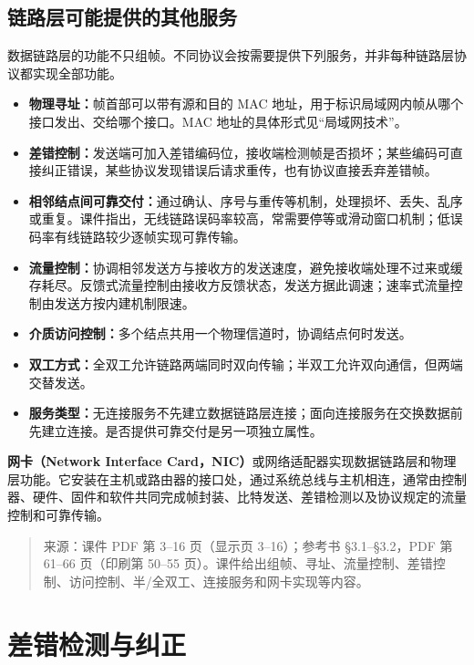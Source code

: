 
\subsection{链路层可能提供的其他服务}
数据链路层的功能不只组帧。不同协议会按需要提供下列服务，并非每种链路层协议都实现全部功能。

\begin{itemize}
 \item \textbf{物理寻址：}帧首部可以带有源和目的 MAC 地址，用于标识局域网内帧从哪个接口发出、交给哪个接口。MAC 地址的具体形式见“局域网技术”。
 \item \textbf{差错控制：}发送端可加入差错编码位，接收端检测帧是否损坏；某些编码可直接纠正错误，某些协议发现错误后请求重传，也有协议直接丢弃差错帧。
 \item \textbf{相邻结点间可靠交付：}通过确认、序号与重传等机制，处理损坏、丢失、乱序或重复。课件指出，无线链路误码率较高，常需要停等或滑动窗口机制；低误码率有线链路较少逐帧实现可靠传输。
 \item \textbf{流量控制：}协调相邻发送方与接收方的发送速度，避免接收端处理不过来或缓存耗尽。反馈式流量控制由接收方反馈状态，发送方据此调速；速率式流量控制由发送方按内建机制限速。
 \item \textbf{介质访问控制：}多个结点共用一个物理信道时，协调结点何时发送。
 \item \textbf{双工方式：}全双工允许链路两端同时双向传输；半双工允许双向通信，但两端交替发送。
 \item \textbf{服务类型：}无连接服务不先建立数据链路层连接；面向连接服务在交换数据前先建立连接。是否提供可靠交付是另一项独立属性。
\end{itemize}

\textbf{网卡（Network Interface Card，NIC）}或网络适配器实现数据链路层和物理层功能。它安装在主机或路由器的接口处，通过系统总线与主机相连，通常由控制器、硬件、固件和软件共同完成帧封装、比特发送、差错检测以及协议规定的流量控制和可靠传输。

\begin{quote}\small 来源：课件 PDF 第 3--16 页（显示页 3--16）；参考书 §3.1--§3.2，PDF 第 61--66 页（印刷第 50--55 页）。课件给出组帧、寻址、流量控制、差错控制、访问控制、半/全双工、连接服务和网卡实现等内容。\end{quote}

\section{差错检测与纠正}

